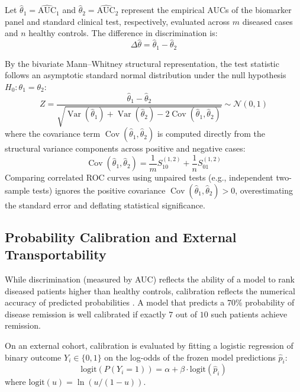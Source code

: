 \documentclass[11pt,twoside,openright]{book}
\begin{document}
Let $\widehat{\theta}_1 = \widehat{\text{AUC}}_1$ and $\widehat{\theta}_2 = \widehat{\text{AUC}}_2$ represent the empirical AUCs of the biomarker panel and standard clinical test, respectively, evaluated across $m$ diseased cases and $n$ healthy controls. The difference in discrimination is:
\begin{equation}
\Delta\widehat{\theta} = \widehat{\theta}_1 - \widehat{\theta}_2
\end{equation}

By the bivariate Mann--Whitney structural representation, the test statistic follows an asymptotic standard normal distribution under the null hypothesis $H_0: \theta_1 = \theta_2$:
\begin{equation}
Z = \frac{\widehat{\theta}_1 - \widehat{\theta}_2}{\sqrt{\operatorname{Var}(\widehat{\theta}_1) + \operatorname{Var}(\widehat{\theta}_2) - 2\operatorname{Cov}(\widehat{\theta}_1, \widehat{\theta}_2)}} \sim \mathcal{N}(0, 1)
\label{eq:delong_test}
\end{equation}
where the covariance term $\operatorname{Cov}(\widehat{\theta}_1, \widehat{\theta}_2)$ is computed directly from the structural variance components across positive and negative cases:
\begin{equation}
\operatorname{Cov}(\widehat{\theta}_1, \widehat{\theta}_2) = \frac{1}{m} S_{10}^{(1, 2)} + \frac{1}{n} S_{01}^{(1, 2)}
\label{eq:delong_cov}
\end{equation}
Comparing correlated ROC curves using unpaired tests (e.g., independent two-sample tests) ignores the positive covariance $\operatorname{Cov}(\widehat{\theta}_1, \widehat{\theta}_2) > 0$, overestimating the standard error and deflating statistical significance.

\subsection{Probability Calibration and External Transportability}

While discrimination (measured by AUC) reflects the ability of a model to rank diseased patients higher than healthy controls, calibration reflects the numerical accuracy of predicted probabilities \cite{van2016calibration}. A model that predicts a $70\%$ probability of disease remission is well calibrated if exactly $7$ out of $10$ such patients achieve remission.

On an external cohort, calibration is evaluated by fitting a logistic regression of binary outcome $Y_i \in \{0, 1\}$ on the log-odds of the frozen model predictions $\hat{p}_i$:
\begin{equation}
\text{logit}(P(Y_i = 1)) = \alpha + \beta \cdot \text{logit}(\hat{p}_i)
\label{eq:calibration_model}
\end{equation}
where $\text{logit}(u) = \ln(u / (1 - u))$.
\end{document}
